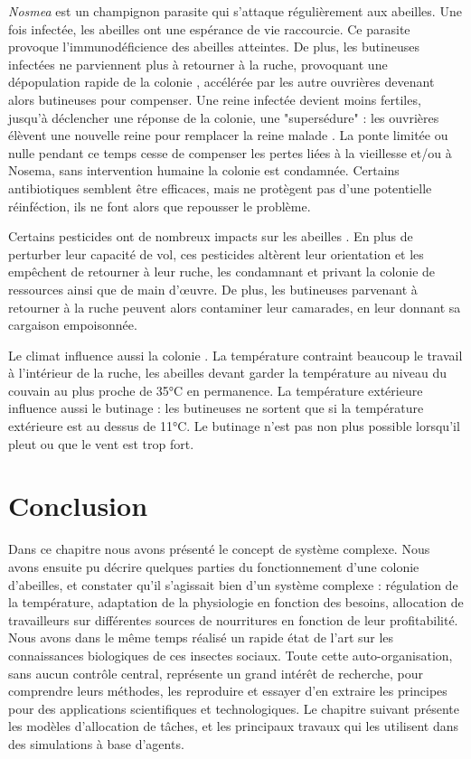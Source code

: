 		\textit{Nosmea} est un champignon parasite qui s'attaque régulièrement aux abeilles. Une fois infectée, les abeilles ont une espérance de vie raccourcie. Ce parasite provoque l'immunodéficience des abeilles atteintes. De plus, les butineuses infectées ne parviennent plus à retourner à la ruche, provoquant une dépopulation rapide de la colonie \cite{higes_how_2008}, accélérée par les autre ouvrières devenant alors butineuses pour compenser. Une reine infectée devient moins fertiles, jusqu'à déclencher une réponse de la colonie, une "supersédure" : les ouvrières élèvent une nouvelle reine pour remplacer la reine malade \cite{alaux_pathological_2011}. La ponte limitée ou nulle pendant ce temps cesse de compenser les pertes liées à la vieillesse et/ou à Nosema, sans intervention humaine la colonie est condamnée. Certains antibiotiques semblent être efficaces, mais ne protègent pas d'une potentielle réinféction, ils ne font alors que repousser le problème.
		
		Certains pesticides ont de nombreux impacts sur les abeilles \cite{betti_bee_2017}. En plus de perturber leur capacité de vol, ces pesticides altèrent leur orientation et les empêchent de retourner à leur ruche, les condamnant et privant la colonie de ressources ainsi que de main d'œuvre. De plus, les butineuses parvenant à retourner à la ruche peuvent alors contaminer leur camarades, en leur donnant sa cargaison empoisonnée.
		
		Le climat influence aussi la colonie \cite{riviere_toward_2018}. La température contraint beaucoup le travail à l'intérieur de la ruche, les abeilles devant garder la température au niveau du couvain au plus proche de 35°C en permanence. La température extérieure influence aussi le butinage : les butineuses ne sortent que si la température extérieure est au dessus de 11°C. Le butinage n'est pas non plus possible lorsqu'il pleut ou que le vent est trop fort.
		
			
			
		\section*{Conclusion}
			
		Dans ce chapitre nous avons présenté le concept de système complexe. Nous avons ensuite pu décrire quelques parties du fonctionnement d'une colonie d'abeilles, et constater qu'il s'agissait bien d'un système complexe : régulation de la température, adaptation de la physiologie en fonction des besoins, allocation de travailleurs sur différentes sources de nourritures en fonction de leur profitabilité. Nous avons dans le même temps réalisé un rapide état de l'art sur les connaissances biologiques de ces insectes sociaux. Toute cette auto-organisation, sans aucun contrôle central, représente un grand intérêt de recherche, pour comprendre leurs méthodes, les reproduire et essayer d'en extraire les principes pour des applications scientifiques et technologiques. Le chapitre suivant présente les modèles d'allocation de tâches, et les principaux travaux qui les utilisent dans des simulations à base d'agents.